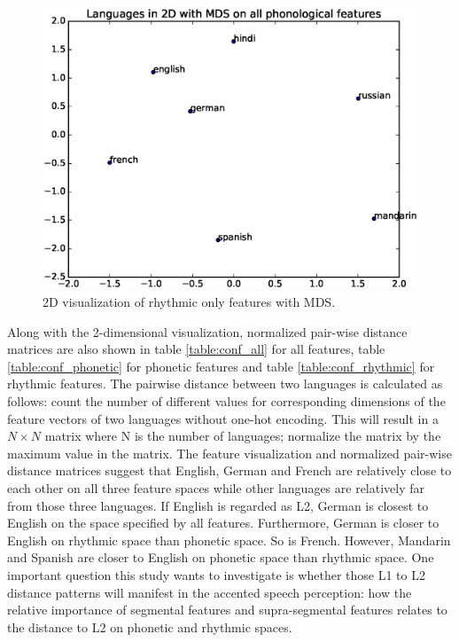 \begin{figure}
  \includegraphics[width=\linewidth]{figures/rhythmic_MDS.eps}
  \caption{2D visualization of rhythmic only features with MDS.}\label{fig:rhythmic_mds}
\endminipage
\end{figure}

Along with the 2-dimensional visualization, normalized pair-wise distance matrices are also shown in table \ref{table:conf_all} for all features, table \ref{table:conf_phonetic} for phonetic features and table \ref{table:conf_rhythmic} for rhythmic features. The pairwise distance between two languages is calculated as follows: count the number of different values for corresponding dimensions of the feature vectors of two languages without one-hot encoding. This will result in a $N \times N$ matrix where N is the number of languages; normalize the matrix by the maximum value in the matrix. The feature visualization and normalized pair-wise distance matrices suggest that English, German and French are relatively close to each other on all three feature spaces while other languages are relatively far from those three languages. If English is regarded as L2, German is closest to English on the space specified by all features. Furthermore, German is closer to English on rhythmic space than phonetic space. So is French. However, Mandarin and Spanish are closer to English on phonetic space than rhythmic space. One important question this study wants to investigate is whether those L1 to L2 distance patterns will manifest in the accented speech perception: how the relative importance of segmental features and supra-segmental features relates to the distance to L2 on phonetic and rhythmic spaces.

